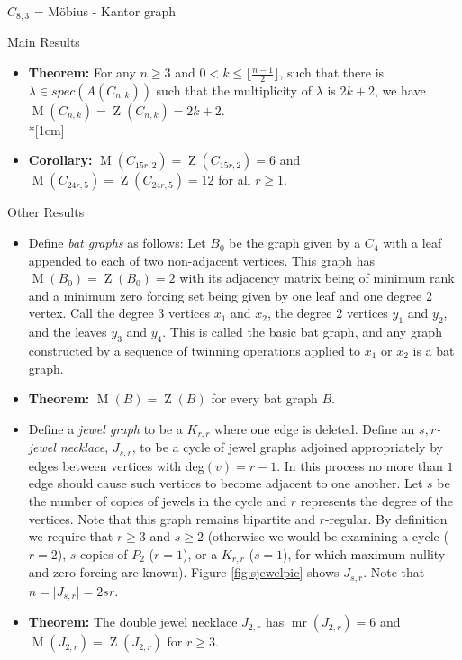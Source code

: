\documentclass[final]{beamer}
\newcommand{\mr}{\operatorname{mr}}
\newcommand{\M}{\operatorname{M}}
\newcommand{\Z}{\operatorname{Z}}
\newcommand{\bit}{\begin{itemize}}
\newcommand{\eit}{\end{itemize}}
\begin{document}
\begin{frame}{}
\begin{columns}[t]
\begin{column}{0.38 \linewidth}
\begin{block}{$C_{8,3}$ = M\"{o}bius - Kantor graph}
\end{block}
        
\begin{block}{Main Results}
\bit
\item[]{\bf Theorem:} For any $n \geq 3$ and $0 <  k  \leq \lfloor \frac{n-1}{2} \rfloor$, such that there is $\lambda \in spec(A(C_{n,k}))$ such that the multiplicity of $\lambda$ is  $2k+2$, we have $\M(C_{n,k}) = \Z(C_{n,k}) = 2k+2$.\\*[1cm]

\item[]{\bf Corollary:} $\M(C_{15r,2}) = \Z(C_{15r,2}) = 6$ and 
$\M(C_{24r,5}) = \Z(C_{24r,5}) = 12$ for all $r \geq 1$.
\eit
\end{block}

\begin{block}{Other Results}
\bit
\item Define {\color{blue}\emph{bat graphs}} as follows: Let $B_0$ be the graph given by a $C_4$ with a leaf appended to each of two non-adjacent vertices. This graph has $\M(B_0) = \Z(B_0) = 2$ with its adjacency matrix being of minimum rank and a minimum zero forcing set being given by one leaf and one degree 2 vertex. Call the degree 3 vertices $x_1$ and $x_2$, the degree 2 vertices $y_1$ and $y_2$, and the leaves $y_3$ and $y_4$. This is called the basic bat graph, and any graph constructed by a sequence of twinning operations applied to $x_1$ or $x_2$ is a bat graph.
\item {\bf Theorem:}  $\M(B) = \Z(B)$ for every bat graph $B$.
\item Define a {\color{blue}\emph{jewel graph}} to be a $K_{r,r}$ where one edge is deleted. Define an \emph{$s,r$-jewel necklace}, $J_{s,r}$, to be a cycle of jewel graphs adjoined appropriately by edges between vertices with deg$(v) = r-1$. In this process no more than $1$ edge should cause such vertices to become adjacent to one another. Let $s$ be the number of copies of jewels in the cycle and $r$ represents the degree of the vertices. Note that this graph remains bipartite and $r$-regular. By definition we require that $r \geq 3$ and $s \geq 2$ (otherwise we would be examining a cycle ($r=2$), $s$ copies of $P_2$ ($r=1$), or a $K_{r,r}$ ($s=1$), for which maximum nullity and zero forcing are known). Figure  \ref{fig:sjewelpic} shows $J_{s,r}$. Note that $n = \mid J_{s,r}\mid = 2sr$.
\item {\bf Theorem:} The double jewel necklace $J_{2,r}$ has $\mr(J_{2,r})=6$ and $\M(J_{2,r}) = \Z(J_{2,r})$ for $r \geq 3$.
\eit
\end{block}


\end{column}
\end{columns}
\end{frame}
\end{document}
